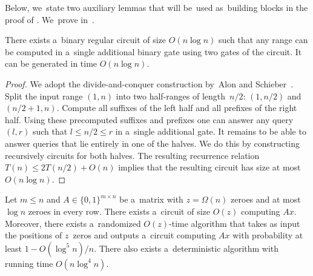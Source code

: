\documentclass{toc}
\begin{document}
Below, we~state two auxiliary lemmas that will
be~used as~building blocks in the proof of .
We~prove 
in~.

\begin{lemma}\label{lemma:decompose}
There exists a~binary regular circuit of size $O(n\log n)$ such that
any range can be computed in a~single additional binary gate
using two gates of the circuit. It can be generated in time
$O(n\log n)$.
\end{lemma}

\begin{proof}%
	We adopt the divide-and-conquer construction by~Alon and
	Schieber~\cite{Alon87optimalpreprocessing}. Split the input range $(1,n)$ into
	two half-ranges of length~$n/2$:
	$(1,n/2)$ and $(n/2+1,n)$.
	Compute all suffixes of the left half and all prefixes of
	the right half.
	Using these precomputed suffixes and
	prefixes one can answer any query $(l,r)$ such that $l \le n/2
	\le r$ in a~single additional gate. It remains to be able to answer
	queries that lie entirely in one of the halves. We do this by
	constructing recursively circuits for both halves. The resulting
	recurrence relation $T(n) \le 2T(n/2)+O(n)$ implies that the
	resulting circuit has size at most $O(n\log n)$.
\end{proof}



\begin{lemma}\label{lemma:permute}
Let $m \le n$ and $A \in \{0,1\}^{m \times n}$
be a~matrix with $z=\Omega(n)$ zeroes and at most $\log n$ zeroes in every row.
There exists a~circuit of size $O(z)$ computing $Ax$. Moreover, there exists
a~randomized $O(z)$-time %
algorithm that takes as input the positions of
$z$~zeros and outputs a~circuit computing $Ax$ with probability at least
$1-O(\log^5n)/n$. There also exists a~deterministic algorithm with
running time $O(n\log^4n)$.
\end{lemma}
\end{document}
